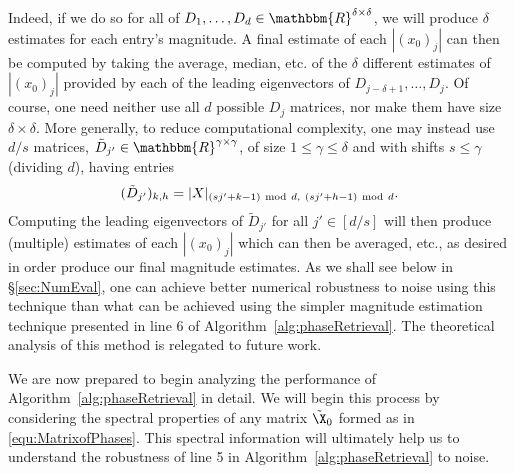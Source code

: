 Indeed, if we do so for all of $D_1, \dots, D_d \in \mathbbm{R}^{\delta \times \delta}$, we will produce $\delta$ estimates for each entry's magnitude.  A final estimate of each $|(x_0)_j|$ can then be computed by taking the average, median, etc. of the $\delta$ different estimates of $|(x_0)_j|$ provided by each of the leading eigenvectors of $D_{j-\delta+1}, \dots, D_j$.  Of course, one need neither use all $d$ possible $D_j$ matrices, nor make them have size $\delta \times \delta$.  More generally, to reduce computational complexity, one may instead use $d/s$ matrices, $\tilde{D}_{j'} \in \mathbbm{R}^{\gamma \times \gamma}$, of size $1 \leq \gamma \leq \delta$ and with shifts $s \leq \gamma$ (dividing $d$), having entries
$$(\tilde{D}_{j'})_{k,h} = |X|_{(sj'+k-1)~{\rm mod}~d,~(sj'+h-1)~{\rm mod}~d}.$$
Computing the leading eigenvectors of $\tilde{D}_{j'}$ for all $j' \in [d/s]$ will then produce (multiple) estimates of each $|(x_0)_j|$ which can then be averaged, etc., as desired in order produce our final magnitude estimates.  As we shall see below in \S \ref{sec:NumEval}, one can achieve better numerical robustness to noise using this technique than what can be achieved using the simpler magnitude estimation technique presented in line 6 of Algorithm~\ref{alg:phaseRetrieval}.  The theoretical analysis of this method is relegated to future work. 


We are now prepared to begin analyzing the performance of Algorithm~\ref{alg:phaseRetrieval} in detail.  We will begin this process by considering the spectral properties of any matrix $\tilde{\X}_0$ formed as in \eqref{equ:MatrixofPhases}.  This spectral information will ultimately help us to understand the robustness of line 5 in Algorithm~\ref{alg:phaseRetrieval} to noise.
